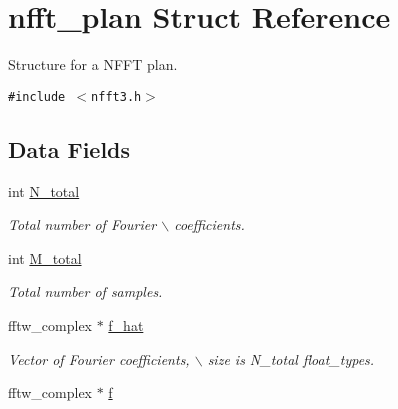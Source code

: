 \hypertarget{structnfft__plan}{
\section{nfft\_\-plan Struct Reference}
\label{structnfft__plan}
}
Structure for a NFFT plan.  


{\tt \#include $<$nfft3.h$>$}

\subsection*{Data Fields}
\begin{CompactItemize}
\item 
\hypertarget{structnfft__plan_d33daddf76670c8731c759bf74ad0d22}{
int \hyperlink{structnfft__plan_d33daddf76670c8731c759bf74ad0d22}{N\_\-total}}
\label{structnfft__plan_d33daddf76670c8731c759bf74ad0d22}

\begin{CompactList}\small\item\em Total number of Fourier $\backslash$ coefficients. \item\end{CompactList}\item 
\hypertarget{structnfft__plan_df33ce87c35b396c50d214d9bdeeefe6}{
int \hyperlink{structnfft__plan_df33ce87c35b396c50d214d9bdeeefe6}{M\_\-total}}
\label{structnfft__plan_df33ce87c35b396c50d214d9bdeeefe6}

\begin{CompactList}\small\item\em Total number of samples. \item\end{CompactList}\item 
\hypertarget{structnfft__plan_23409aec68871e9a56f11711e2891691}{
fftw\_\-complex $\ast$ \hyperlink{structnfft__plan_23409aec68871e9a56f11711e2891691}{f\_\-hat}}
\label{structnfft__plan_23409aec68871e9a56f11711e2891691}

\begin{CompactList}\small\item\em Vector of Fourier coefficients, $\backslash$ size is N\_\-total float\_\-types. \item\end{CompactList}\item 
\hypertarget{structnfft__plan_fa27a166f809acf70ae27e5e6f28daa5}{
fftw\_\-complex $\ast$ \hyperlink{structnfft__plan_fa27a166f809acf70ae27e5e6f28daa5}{f}}
\label{structnfft__plan_fa27a166f809acf70ae27e5e6f28daa5}


\end{CompactItemize}
